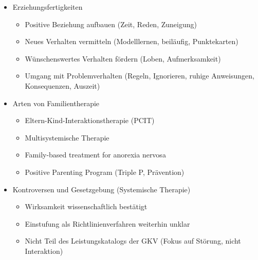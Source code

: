 \documentclass[11pt, paper=a4, twocolumn]{scrartcl}
\begin{document}
\begin{itemize}
\begin{itemize}
				\end{itemize}
			\item Erziehungsfertigkeiten
				\begin{itemize}
					\item Positive Beziehung aufbauen (Zeit, Reden, Zuneigung)
					\item Neues Verhalten vermitteln (Modelllernen, beiläufig, Punktekarten)
					\item Wünschenswertes Verhalten fördern (Loben, Aufmerksamkeit)
					\item Umgang mit Problemverhalten (Regeln, Ignorieren, ruhige Anweisungen, Konsequenzen, Auszeit)
				\end{itemize}
			\item Arten von Familientherapie
				\begin{itemize}
					\item Eltern-Kind-Interaktionstherapie (PCIT)
					\item Multisystemische Therapie
					\item Family-based treatment for anorexia nervosa
					\item Positive Parenting Program (Triple P, Prävention)
				\end{itemize}
			\item Kontroversen und Gesetzgebung (Systemische Therapie)
				\begin{itemize} 
					\item Wirksamkeit wissenschaftlich bestätigt
					\item Einstufung als Richtlinienverfahren weiterhin unklar
					\item Nicht Teil des Leistungskatalogs der GKV (Fokus auf Störung, nicht Interaktion)
				\end{itemize}
		\end{itemize}
\end{document}
